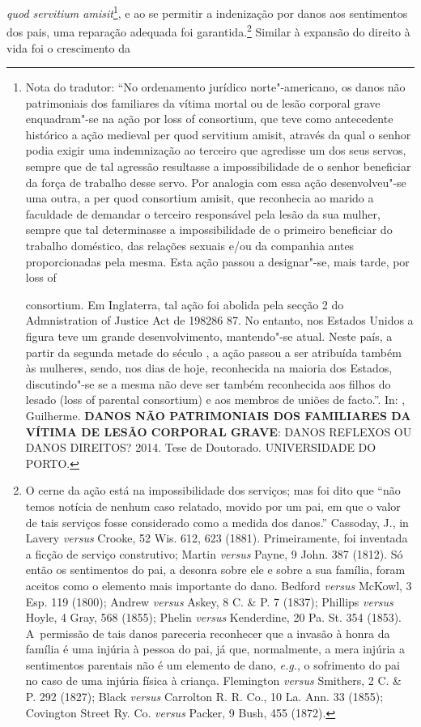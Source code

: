 \emph{quod servitium amisit}\footnote{Nota do tradutor: ``No ordenamento
  jurídico norte"-americano, os danos não patrimoniais dos familiares da
  vítima mortal ou de lesão corporal grave enquadram"-se na ação por loss
  of consortium, que teve como antecedente histórico a ação medieval per
  quod servitium amisit, através da qual o senhor podia exigir uma
  indemnização ao terceiro que agredisse um dos seus servos, sempre que
  de tal agressão resultasse a impossibilidade de o senhor beneficiar da
  força de trabalho desse servo. Por analogia com essa ação
  desenvolveu"-se uma outra, a per quod consortium amisit, que reconhecia
  ao marido a faculdade de demandar o terceiro responsável pela lesão da
  sua mulher, sempre que tal determinasse a impossibilidade de o
  primeiro beneficiar do trabalho doméstico, das relações sexuais e/ou
  da companhia antes proporcionadas pela mesma. Esta ação passou a
  designar"-se, mais tarde, por loss of

  consortium. Em Inglaterra, tal ação foi abolida pela secção 2 do
  Admnistration of Justice Act de 198286 87. No entanto, nos Estados
  Unidos a figura teve um grande desenvolvimento, mantendo"-se atual.
  Neste país, a partir da segunda metade do século , a ação passou a
  ser atribuída também às mulheres, sendo, nos dias de hoje, reconhecida
  na maioria dos Estados, discutindo"-se se a mesma não deve ser também
  reconhecida aos filhos do lesado (loss of parental consortium) e aos
  membros de uniões de facto.''. In: , Guilherme. \textbf{DANOS
  NÃO PATRIMONIAIS DOS FAMILIARES DA VÍTIMA DE LESÃO CORPORAL GRAVE}:
  DANOS REFLEXOS OU DANOS DIREITOS? 2014. Tese de Doutorado.
  UNIVERSIDADE DO PORTO.}, e ao se permitir a indenização por danos aos
sentimentos dos pais, uma reparação adequada foi garantida.\footnote{O
  cerne da ação está na impossibilidade dos serviços; mas foi dito que
  ``não temos notícia de nenhum caso relatado, movido por um pai, em que
  o valor de tais serviços fosse considerado como a medida dos danos.''
  Cassoday, J., in Lavery \emph{versus} Crooke, 52 Wis. 612, 623 (1881).
  Primeiramente, foi inventada a ficção de serviço construtivo; Martin
  \emph{versus} Payne, 9 John. 387 (1812). Só então os sentimentos do
  pai, a desonra sobre ele e sobre a sua família, foram aceitos como o
  elemento mais importante do dano. Bedford \emph{versus} McKowl, 3 Esp.
  119 (1800); Andrew \emph{versus} Askey, 8 C. \& P. 7 (1837); Phillips
  \emph{versus} Hoyle, 4 Gray, 568 (1855); Phelin \emph{versus}
  Kenderdine, 20 Pa. St. 354 (1853). A~permissão de tais danos pareceria
  reconhecer que a invasão à honra da família é uma injúria à pessoa do
  pai, já que, normalmente, a mera injúria a sentimentos parentais não é
  um elemento de dano, \emph{e.g.}, o sofrimento do pai no caso de uma
  injúria física à criança. Flemington \emph{versus} Smithers, 2 C. \&
  P. 292 (1827); Black \emph{versus} Carrolton R. R. Co., 10 La. Ann. 33
  (1855); Covington Street Ry. Co. \emph{versus} Packer, 9 Bush, 455
  (1872).} Similar à expansão do direito à vida foi o crescimento da
